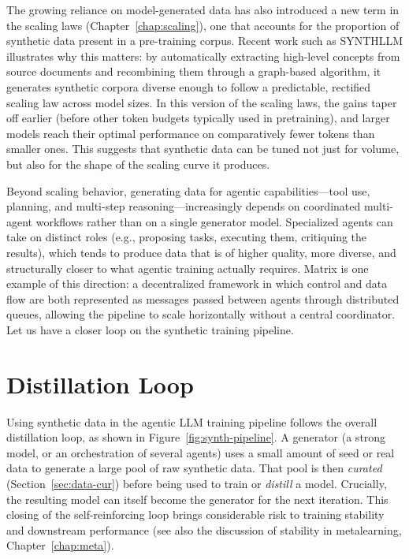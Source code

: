 The growing reliance on model-generated data has also introduced a new term in the scaling laws (Chapter~\ref{chap:scaling}), one that accounts for the proportion of synthetic data present in a pre-training corpus. Recent work such as SYNTHLLM \citep{qin2025scaling} illustrates why this matters: by automatically extracting high-level concepts from source documents and recombining them through a graph-based algorithm, it generates synthetic corpora diverse enough to follow a predictable, rectified scaling law across model sizes. In this version of the scaling laws, the gains taper off earlier (before other token budgets typically used in pretraining), and larger models reach their optimal performance on comparatively fewer tokens than smaller ones. This suggests that synthetic data can be tuned not just for volume, but also for the shape of the scaling curve it produces.

Beyond scaling behavior, generating data for agentic capabilities---tool use, planning, and multi-step reasoning---increasingly depends on coordinated multi-agent workflows rather than on a single generator model. Specialized agents can take on distinct roles (e.g., proposing tasks, executing them, critiquing the results), which tends to produce data that is of higher quality, more diverse, and structurally closer to what agentic training actually requires. Matrix \citep{wang2025matrixpeertopeermultiagentsynthetic} is one example of this direction: a decentralized framework in which control and data flow are both represented as messages passed between agents through distributed queues, allowing the pipeline to scale horizontally without a central coordinator. Let us have a closer loop on the synthetic training pipeline.


\section{Distillation Loop}
\label{sec:distillation}
Using synthetic data in the agentic LLM training pipeline follows the overall distillation loop, as shown in Figure~\ref{fig:synth-pipeline}. A generator (a strong model, or an orchestration of several agents) uses a small amount of seed or real data to generate a large pool of raw synthetic data. That pool is then \emph{curated} (Section~\ref{sec:data-cur}) before being used to train or \emph{distill} a model. Crucially, the resulting model can itself become the generator for the next iteration. This closing of the self-reinforcing loop brings considerable risk to training stability and downstream performance (see also the discussion of stability in metalearning, Chapter~\ref{chap:meta}).

